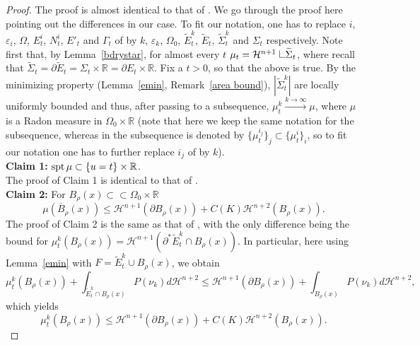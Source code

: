 \documentclass[11pt]{amsart}
\renewcommand{\epsilon}{\varepsilon}
\def\R{\mathbb{R}}
\def\d{\delta}
\def\e{\epsilon}
\def\r{\rho}
\def\H{\mathcal{H}}
\def\wt{\widetilde}
\def\ov{\overline}
\def\res{\hbox{ {\vrule height .25cm}{\leaders\hrule\hskip.2cm}}\hskip5.0\mu}
\begin{document}
\begin{proof}
The proof is almost identical to that of \cite[Proposition 5.10]{S08}. We go through the proof here pointing out the differences in our case. To fit our notation, one has to replace $i$, $\e_i$, $\Omega$, $E_t^i$, $N_t^i$, $E'_t$ and $\Gamma_t$  of \cite[Proposition 5.10]{S08} by $k$, $\e_k$, $\Omega_0$, $\wt E_t^k$, $\wt E_t$, $\wt \Sigma_t^k$ and $\Sigma_t$ respectively.
Note first that, by Lemma~\ref{bdrystar}, for almost every $t$   $\mu_t= \H^{n+1}\res \wt \Sigma_t$, where recall that $\wt \Sigma_t=\partial \wt E_t=\Sigma_t\times\R=\partial E_t\times\R$.
Fix a $t>0$, so that the above is true. By the minimizing property (Lemma~\ref{emin}, Remark~\ref{area bound}), $|\wt \Sigma^k_t|$ are locally uniformly bounded and thus, after passing to a subsequence,  $\mu_t^k\stackrel{k\to\infty}{\longrightarrow}\mu$, where $\mu$ is a Radon measure in $\Omega_0\times\R$ (note that here we keep the same notation for the subsequence, whereas in \cite[Proposition 5.10]{S08} the subsequence is denoted by $\{\mu_t^{i_j}\}_j\subset\{\mu_t^i\}_i$, so to fit our notation one has to further replace $i_j$ of \cite[Proposition 5.10]{S08} by $k$).\\
{\bf Claim 1:} $\spt \mu\subset\{u=t\}\times\R$.\\
The proof of Claim 1 is identical to that of \cite[Claim 1 of proof of Proposition 5.10]{S08}.\\
{\bf Claim 2:} For $B_\r(x)\subset\subset\Omega_0\times\R$
\[\mu(\ov B_\r(x))\le \H^{n+1}(\partial B_\r(x))+C(K)\H^{n+2}(B_\r(x)).\]
The proof of Claim 2 is the same as  that of \cite[Claim 2 of proof of Proposition 5.10]{S08}, with the only difference being the bound for $\mu^{k}_t(B_\r(x))=\H^{n+1}(\partial^* \wt E_t^k\cap B_\r(x))$. In particular, here using Lemma~\ref{emin} with $F= \wt E_t^k\cup B_\r(x)$,  we obtain
\[\mu^{k}_t(B_\r(x))+\int_{\wt E_t^k\cap B_\r(x)} P(\nu_k)d\H^{n+2}\le  \H^{n+1}( \partial B_\r(x))+\int_{ B_\r(x)} P(\nu_k)d\H^{n+2},\]
which yields
\[ \mu^{k}_t(B_\r(x))\le \H^{n+1}( \partial B_\r(x))+C(K)\H^{n+2}( B_\r(x)).\]


\end{proof}
\end{document}
